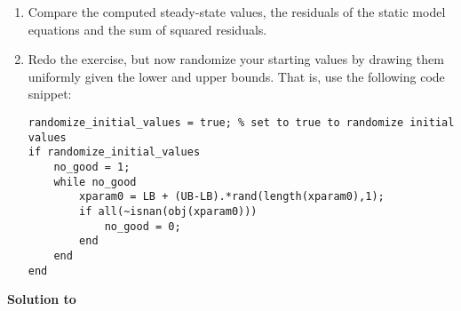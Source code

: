 \begin{enumerate}
\item
Compare the computed steady-state values, the residuals of the static model equations and the sum of squared residuals.

\item
Redo the exercise, but now randomize your starting values
  by drawing them uniformly given the lower and upper bounds.
That is, use the following code snippet:
\begin{lstlisting}[style=Matlab-editor,basicstyle=\mlttfamily\scriptsize]
randomize_initial_values = true; % set to true to randomize initial values
if randomize_initial_values
    no_good = 1;
    while no_good
        xparam0 = LB + (UB-LB).*rand(length(xparam0),1);
        if all(~isnan(obj(xparam0)))
            no_good = 0;
        end
    end
end
\end{lstlisting}
\end{enumerate}

\begin{solution}\textbf{Solution to }
\ifDisplaySolutions%

\fi
\newpage
\end{solution}